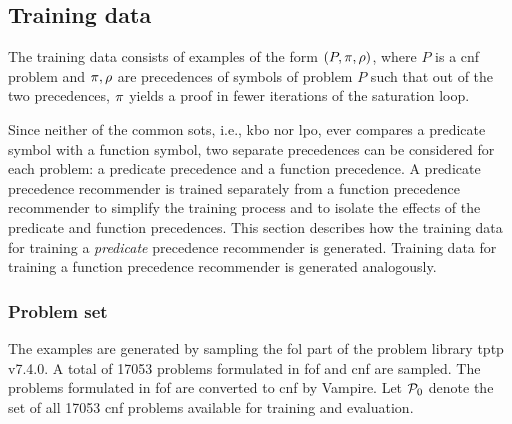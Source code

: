
\subsection{Training data}

The training data consists of examples of the form $(P, \pi, \rho)$,
where $P$ is a \gls{cnf} problem and $\pi, \rho$ are precedences of symbols of problem $P$
such that out of the two precedences, $\pi$ yields a proof in fewer iterations of the saturation loop.

Since neither of the common \glspl{sot}, i.e., \gls{kbo} nor \gls{lpo}, ever compares a predicate symbol with a function symbol,
two separate precedences can be considered for each problem:
a predicate precedence and a function precedence.
A predicate precedence recommender is trained separately from a function precedence recommender
to simplify the training process and to isolate the effects of the predicate and function precedences.
This section describes how the training data for training a \emph{predicate} precedence recommender is generated.
Training data for training a function precedence recommender is generated analogously.

\subsubsection{Problem set}

The examples are generated by sampling the \gls{fol} part of the problem library \gls{tptp} v7.4.0.
A total of \num{17053} problems formulated in \gls{fof} and \gls{cnf} are sampled.
The problems formulated in \gls{fof} are converted to \gls{cnf} by Vampire.
Let $\operatorname{\mathcal{P}_{0}}$ denote the set of all \num{17053} \gls{cnf} problems available for training and evaluation.

